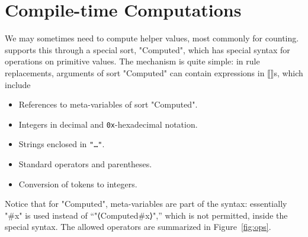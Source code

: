 \documentclass[11pt]{article} %
\begin{document}



\section{Compile-time Computations}
\label{sec:comp}

We may sometimes need to compute helper values, most commonly for counting. \HAX supports this
through a special sort, "Computed", which has special syntax for operations on primitive values.
The mechanism is quite simple: in rule replacements, arguments of sort "Computed" can contain
expressions in ⟦⟧s, which include
\begin{itemize}
\item References to meta-variables of sort "Computed".
\item Integers in decimal and \texttt{0x}-hexadecimal notation.
\item Strings enclosed in \texttt{"…"}.
\item Standard operators and parentheses.
\item Conversion of tokens to integers.
\end{itemize}
Notice that for "Computed", meta-variables are part of the syntax: essentially "#x" is used instead
of ``"⟨Computed#x⟩",'' which is not permitted, inside the special syntax.  The allowed operators are
summarized in Figure~\ref{fig:ops}.
\end{document}
